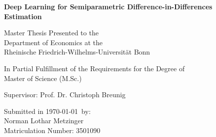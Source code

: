 
\begin{titlepage}

\begin{center}

\vspace*{0.4cm}

\huge {\bfseries Deep Learning for Semiparametric Difference-in-Differences Estimation}

\vspace{1cm}

\large {Master Thesis Presented to the}\\
\large {Department of Economics at the}\\
\large {Rheinische Friedrich-Wilhelms-Universität Bonn}\\

\end{center}

\vspace{1cm}

\begin{center}


\large {In Partial Fulfillment of the Requirements for the Degree of}\\
\large {Master of Science (M.Sc.)}\\

\end{center}
\vspace{1cm}
\begin{center}

\vspace*{1cm}


\large {Supervisor: Prof. Dr. Christoph Breunig}\\

\end{center}

\vspace{1cm}

\begin{center}

\vfill


\large {Submitted in \today \, by:}\\
\large {Norman Lothar Metzinger}\\
\large {Matriculation Number: 3501090}\\

\end{center}

\vspace{1cm}



\setcounter{page}{0}\clearpage




\end{titlepage}

\endinput
